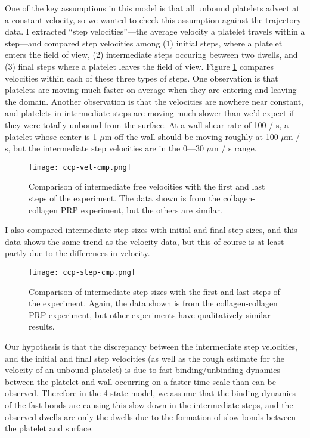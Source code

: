 \documentclass{article}
\begin{document}
One of the key assumptions in this model is that all unbound platelets
advect at a constant velocity, so we wanted to check this assumption
against the trajectory data. I extracted ``step velocities''---the
average velocity a platelet travels within a step---and compared step
velocities among (1) initial steps, where a platelet enters the field
of view, (2) intermediate steps occuring between two dwells, and (3)
final steps where a platelet leaves the field of view. Figure
\ref{fig:ccp-vel-cmp} compares velocities within each of these three
types of steps. One observation is that platelets are moving
much faster on average when they are entering and leaving the
domain. Another observation is that the velocities are nowhere near
constant, and platelets in intermediate steps are moving much slower
than we'd expect if they were totally unbound from the surface. At a
wall shear rate of 100 / s, a platelet whose center is 1 $\mu$m off
the wall should be moving roughly at 100 $\mu$m / s, but the
intermediate step velocities are in the 0---30 $\mu$m / s range. 

\begin{figure}
  \centering
  \texttt{[image: ccp-vel-cmp.png]}
  \caption{Comparison of intermediate free velocities with the first
    and last steps of the experiment. The data shown is from
    the collagen-collagen PRP experiment, but the others are similar.}
  \label{fig:ccp-vel-cmp}
\end{figure}

I also compared intermediate step sizes with initial and final step
sizes, and this data shows the same trend as the velocity data, but
this of course is at least partly due to the differences in velocity.

\begin{figure}
  \centering
  \texttt{[image: ccp-step-cmp.png]}
  \caption{Comparison of intermediate step sizes with the first and
    last steps of the experiment. Again, the data shown is from the
    collagen-collagen PRP experiment, but other experiments have
    qualitatively similar results.}
  \label{fig:ccp-step-cmp}
\end{figure}

Our hypothesis is that the discrepancy between the intermediate step
velocities, and the initial and final step velocities (as well as the
rough estimate for the velocity of an unbound platelet) is due to fast
binding/unbinding dynamics between the platelet and wall occurring on
a faster time scale than can be observed. Therefore in the 4 state
model, we assume that the binding dynamics of the fast bonds are
causing this slow-down in the intermediate steps, and the observed
dwells are only the dwells due to the formation of slow bonds between the
platelet and surface.
\end{document}
